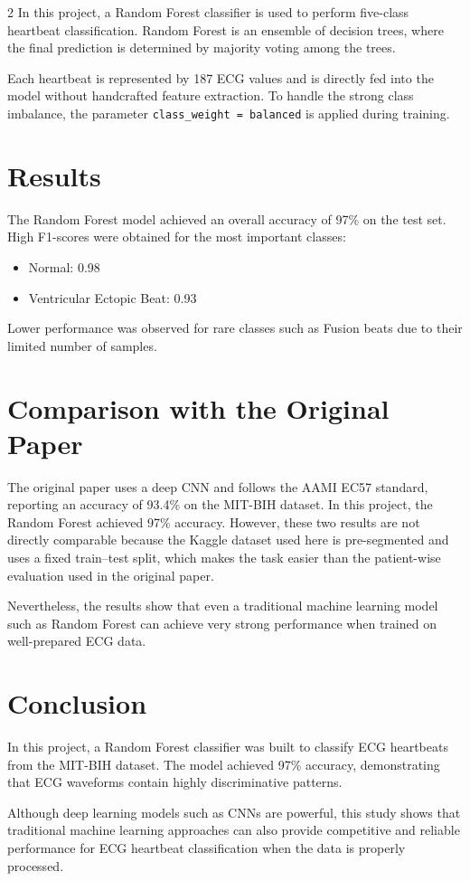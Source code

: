 \documentclass[a4paper,10pt]{article}
\begin{document}
\begin{multicols}{2}
In this project, a Random Forest classifier is used to perform five-class heartbeat classification.  
Random Forest is an ensemble of decision trees, where the final prediction is determined by majority voting among the trees.

Each heartbeat is represented by 187 ECG values and is directly fed into the model without handcrafted feature extraction.  
To handle the strong class imbalance, the parameter \texttt{class\_weight = balanced} is applied during training.

\section{Results}

The Random Forest model achieved an overall accuracy of 97\% on the test set.  
High F1-scores were obtained for the most important classes:
\begin{itemize}
    \item Normal: 0.98
    \item Ventricular Ectopic Beat: 0.93
\end{itemize}

Lower performance was observed for rare classes such as Fusion beats due to their limited number of samples.

\section{Comparison with the Original Paper}

The original paper uses a deep CNN and follows the AAMI EC57 standard, reporting an accuracy of 93.4\% on the MIT-BIH dataset.  
In this project, the Random Forest achieved 97\% accuracy. However, these two results are not directly comparable because the Kaggle dataset used here is pre-segmented and uses a fixed train--test split, which makes the task easier than the patient-wise evaluation used in the original paper.

Nevertheless, the results show that even a traditional machine learning model such as Random Forest can achieve very strong performance when trained on well-prepared ECG data.

\section{Conclusion}

In this project, a Random Forest classifier was built to classify ECG heartbeats from the MIT-BIH dataset. The model achieved 97\% accuracy, demonstrating that ECG waveforms contain highly discriminative patterns.

Although deep learning models such as CNNs are powerful, this study shows that traditional machine learning approaches can also provide competitive and reliable performance for ECG heartbeat classification when the data is properly processed.

\end{multicols}
\end{document}
